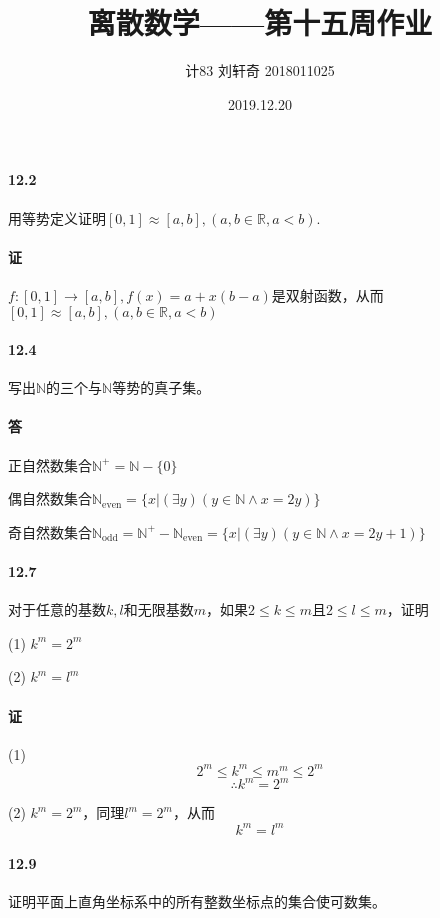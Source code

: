 \documentclass[UTF8]{ctexart}
\title{离散数学——第十五周作业}
\author{计83  刘轩奇  2018011025}
\date{2019.12.20}
\newcommand{\snatural}{\mathbb{N}}
\newcommand{\sreal}{\mathbb{R}}
\begin{document}
\maketitle

\paragraph{12.2} \label{12.2}
    用等势定义证明$[0,1] \approx [a,b], (a,b \in \sreal, a<b)$.

\paragraph{证}
    $f:[0,1] \rightarrow [a,b], f(x) = a+x(b-a)$是双射函数，从而$[0,1] \approx [a,b], (a,b \in \sreal, a<b)$

\paragraph{12.4} \label{12.4}
    写出$\snatural$的三个与$\snatural$等势的真子集。

\paragraph{答}
    正自然数集合$\snatural ^+ = \snatural - \{0\}$

    偶自然数集合$\snatural_{\text{even}} = \{x | ( \exists y) (y \in \snatural \land x = 2y) \}$

    奇自然数集合$\snatural_{\text{odd}} = \snatural^+ - \snatural_{\text{even}} = \{x | ( \exists y) (y \in \snatural \land x = 2y+1) \}$

\paragraph{12.7} \label{12.7}
    对于任意的基数$k,l$和无限基数$m$，如果$2 \le k \le m$且$2 \le l \le m$，证明

    (1) $k^m = 2^m$

    (2) $k^m = l^m$

\paragraph{证}
    (1) $$2^m \le k^m \le m^m \le 2^m$$
    $$\therefore k^m = 2^m$$

    (2) $k^m = 2^m$，同理$l^m = 2^m$，从而
    $$k^m = l^m$$

\paragraph{12.9} \label{12.9}
    证明平面上直角坐标系中的所有整数坐标点的集合使可数集。
\end{document}
